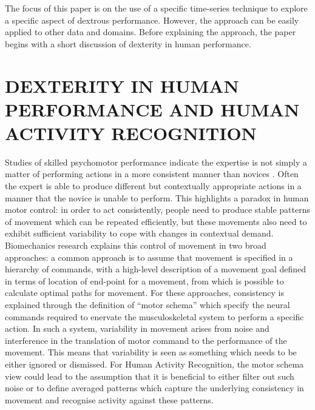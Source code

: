 \documentclass{sigchi}
\begin{document}
The focus of this paper is on the use of a specific time-series technique to explore a specific aspect of 
dextrous performance. However, the approach can be easily applied to other data and domains. 
Before explaining the approach, the paper begins with a short discussion of dexterity in human performance. 


\section{DEXTERITY IN HUMAN PERFORMANCE AND HUMAN ACTIVITY RECOGNITION}
Studies of skilled psychomotor performance indicate the expertise is not simply a matter of performing actions 
in a more consistent manner than novices \cite{Kelso2014}. Often the expert is able to produce different but 
contextually appropriate actions in a manner that the novice is unable to perform. This highlights a paradox 
in human motor control: in order to act consistently, people need to produce stable patterns of movement 
which can be repeated efficiently, but these movements also need to exhibit sufficient variability to cope 
with changes in contextual demand. Biomechanics research explains this control of movement in two broad 
approaches: a common approach is to assume that movement is specified in a hierarchy of commands, 
with a high-level description of a movement goal defined in terms of location of end-point for a movement, 
from which is possible to calculate optimal paths for movement. For these approaches, consistency is 
explained through the definition of ``motor schema'' which specify the neural commands required to enervate 
the musculoskeletal system to perform a specific action. In such a system, variability in movement arises 
from noise and interference in the translation of motor command to the performance of the movement. 
This means that variability is seen as something which needs to be either ignored or dismissed. 
For Human Activity Recognition, the motor schema view could lead to the assumption that it is beneficial 
to either filter out such noise or to define averaged patterns which capture the underlying consistency 
in movement and recognise activity against these patterns. 
\end{document}
